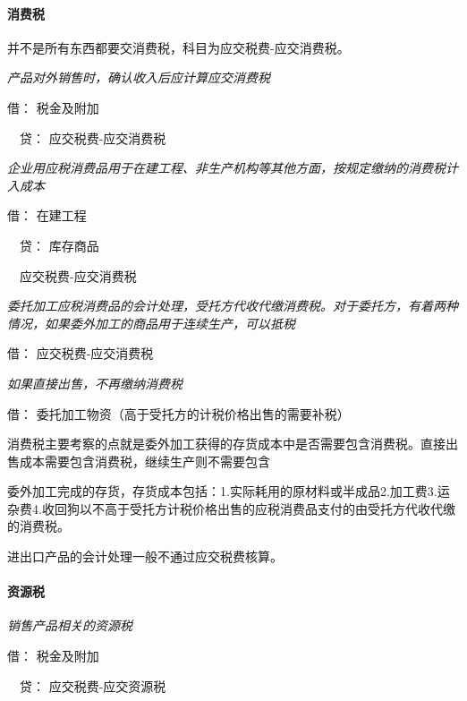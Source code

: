 \documentclass[UTF8,12pt]{ctexart}
\newenvironment{Dr}{\noindent 借：}{\par}
\newenvironment{Cr}{\noindent \ \ 贷：}{\par}
\numberwithin{equation}{section} %
\numberwithin{figure}{section}
\numberwithin{table}{section}
\begin{document}
	\paragraph{消费税}
	并不是所有东西都要交消费税，科目为应交税费-应交消费税。
	
	\textit{产品对外销售时，确认收入后应计算应交消费税}
	
	\begin{Dr}
		税金及附加
	\end{Dr}
	\begin{Cr}
		应交税费-应交消费税
	\end{Cr}

	\textit{企业用应税消费品用于在建工程、非生产机构等其他方面，按规定缴纳的消费税计入成本}
	
	\begin{Dr}
		在建工程
	\end{Dr}
	\begin{Cr}
		库存商品
		
		\ \ 应交税费-应交消费税
	\end{Cr}

	\textit{委托加工应税消费品的会计处理，受托方代收代缴消费税。对于委托方，有着两种情况，如果委外加工的商品用于连续生产，可以抵税}
	
	\begin{Dr}
		应交税费-应交消费税
	\end{Dr}

	\textit{如果直接出售，不再缴纳消费税}
	
	\begin{Dr}
		委托加工物资（高于受托方的计税价格出售的需要补税）
	\end{Dr}

	消费税主要考察的点就是委外加工获得的存货成本中是否需要包含消费税。直接出售成本需要包含消费税，继续生产则不需要包含
	
	委外加工完成的存货，存货成本包括：1.实际耗用的原材料或半成品2.加工费3.运杂费4.收回狗以不高于受托方计税价格出售的应税消费品支付的由受托方代收代缴的消费税。
	
	进出口产品的会计处理一般不通过应交税费核算。
	
	\paragraph{资源税}
	\textit{销售产品相关的资源税}
	
	\begin{Dr}
		税金及附加
	\end{Dr}
	\begin{Cr}
		应交税费-应交资源税
	\end{Cr}
	
\end{document}
